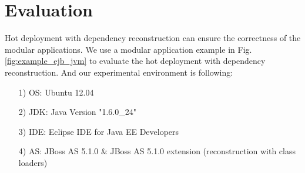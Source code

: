 \documentclass[conference]{IEEEtran}
\begin{document}


\section{Evaluation\label{sec:evaluation}}

Hot deployment with dependency reconstruction can ensure the correctness of the modular applications.
We use a modular application example in Fig. \ref{fig:example_ejb_jvm} to evaluate the hot deployment with dependency reconstruction.
And our experimental environment is following:
\begin{itemize}[]
\item[1)] OS: Ubuntu 12.04
\item[2)] JDK: Java Version "1.6.0\_24"
\item[3)] IDE: Eclipse IDE for Java EE Developers
\item[4)] AS: JBoss AS 5.1.0 \& JBoss AS 5.1.0 extension (reconstruction with class loaders)
\end{itemize}

\end{document}
